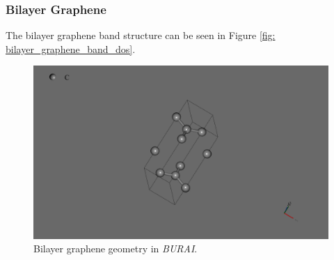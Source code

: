 \documentclass[]{article}
\begin{document}
\subsubsection{Bilayer Graphene}

The bilayer graphene band structure can be seen in Figure \ref{fig: bilayer_graphene_band_dos}.

\begin{figure}[H]
	\centering
	\includegraphics[width = \textwidth]{bilayer_graphene_geometry.PNG}
	\caption{Bilayer graphene geometry in \textit{BURAI}.}
	\label{fig: bilayer_graphene_geometry}
\end{figure}
\end{document}
